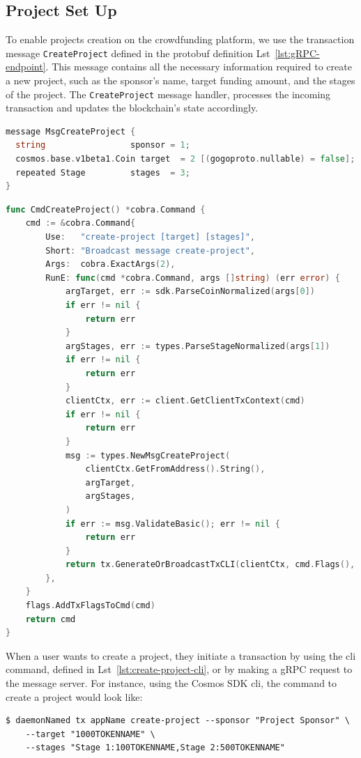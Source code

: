\subsection{Project Set Up}

To enable projects creation on the crowdfunding platform, we use the transaction message \texttt{CreateProject} defined in the protobuf definition Lst~\ref{lst:gRPC-endpoint}. This message contains all the necessary information required to create a new project, such as the sponsor's name, target funding amount, and the stages of the project. The \texttt{CreateProject} message handler, processes the incoming transaction and updates the blockchain's state accordingly.

\begin{lstlisting}[language=go, caption=CreateProject protobuf definition,label={lst:create_project_proto}]
message MsgCreateProject {
  string                 sponsor = 1;
  cosmos.base.v1beta1.Coin target  = 2 [(gogoproto.nullable) = false];
  repeated Stage         stages  = 3;
}
\end{lstlisting}

\begin{lstlisting}[language=go, caption=CreateProject CLI protobuf definition,label={lst:create-project-cli}]
func CmdCreateProject() *cobra.Command {
	cmd := &cobra.Command{
		Use:   "create-project [target] [stages]",
		Short: "Broadcast message create-project",
		Args:  cobra.ExactArgs(2),
		RunE: func(cmd *cobra.Command, args []string) (err error) {
			argTarget, err := sdk.ParseCoinNormalized(args[0])
			if err != nil {
				return err
			}
			argStages, err := types.ParseStageNormalized(args[1])
			if err != nil {
				return err
			}
			clientCtx, err := client.GetClientTxContext(cmd)
			if err != nil {
				return err
			}
			msg := types.NewMsgCreateProject(
				clientCtx.GetFromAddress().String(),
				argTarget,
				argStages,
			)
			if err := msg.ValidateBasic(); err != nil {
				return err
			}
			return tx.GenerateOrBroadcastTxCLI(clientCtx, cmd.Flags(), msg)
		},
	}
	flags.AddTxFlagsToCmd(cmd)
	return cmd
}
\end{lstlisting}

When a user wants to create a project, they initiate a transaction by using the \gls{cli} command, defined in Lst~\ref{lst:create-project-cli},  or by making a gRPC request to the message server. For instance, using the Cosmos SDK \gls{cli}, the command to create a project would look like:

\begin{verbatim}
$ daemonNamed tx appName create-project --sponsor "Project Sponsor" \
    --target "1000TOKENNAME" \
    --stages "Stage 1:100TOKENNAME,Stage 2:500TOKENNAME"
\end{verbatim}

